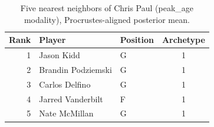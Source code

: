 \begin{table}[htbp]
  \centering\small
  \begin{tabular}{rllc}
    \toprule
    Rank & Player & Position & Archetype \\
    \midrule
    1 & Jason Kidd & G & 1 \\
    2 & Brandin Podziemski & G & 1 \\
    3 & Carlos Delfino & G & 1 \\
    4 & Jarred Vanderbilt & F & 1 \\
    5 & Nate McMillan & G & 1 \\
    \bottomrule
  \end{tabular}
  \caption{Five nearest neighbors of Chris Paul (peak_age modality), Procrustes-aligned posterior mean.}
  \label{tab:Chris_Paul_neighbors_peak_age}
\end{table}

